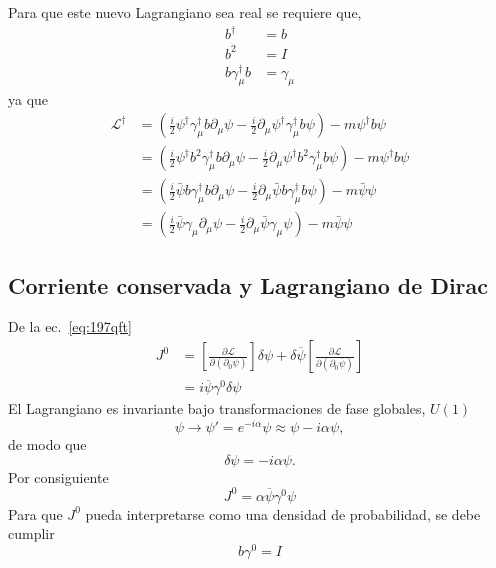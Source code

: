 Para que este nuevo Lagrangiano sea real se requiere que,
\begin{align}
  \label{eq:185qft}
  b^\dagger&=b\nonumber\\
  b^2&=I\nonumber\\
  b \gamma_\mu^\dagger b&=\gamma_\mu
\end{align}
ya que
\begin{align*}
  \mathcal{L}^\dagger&=\left(\frac{i}{2}\psi^\dagger \gamma_\mu^\dagger b \partial_\mu\psi-\frac{i}{2}\partial_\mu\psi^\dagger \gamma_\mu^\dagger b\psi\right)-m\psi^\dagger  b \psi\\
  &=\left(\frac{i}{2}\psi^\dagger b^2 \gamma_\mu^\dagger b \partial_\mu\psi-\frac{i}{2}\partial_\mu\psi^\dagger b^2 \gamma_\mu^\dagger b\psi\right)-m\psi^\dagger b \psi\\
  &=\left(\frac{i}{2}\bar{\psi} b \gamma_\mu^\dagger b \partial_\mu\psi-\frac{i}{2}\partial_\mu\bar{\psi}b \gamma_\mu^\dagger b\psi\right)-m\bar{\psi} \psi\\
  &=\left(\frac{i}{2}\bar{\psi} \gamma_\mu \partial_\mu\psi-\frac{i}{2}\partial_\mu\bar{\psi}\gamma_\mu \psi\right)-m\bar{\psi} \psi
\end{align*}

\subsection{Corriente conservada y Lagrangiano de Dirac}
\label{sec:corriente-conservada}
De la ec.~\eqref{eq:197qft}
\begin{align}
  J^0&=\left[\frac{\partial\mathcal{L}}{\partial\left(\partial_0\psi\right)}\right]\delta\psi+\delta\overline{\psi}\left[\frac{\partial\mathcal{L}}{\partial\left(\partial_0\overline{\psi}\right)}\right]\nonumber\\
  &=i\overline{\psi} \gamma^0 \delta\psi
\end{align}
El Lagrangiano es invariante bajo transformaciones de fase globales, $U(1)$
\begin{equation}
  \psi\to\psi'=e^{-i\alpha}\psi\approx\psi-i\alpha\psi,
\end{equation}
de modo que
\begin{equation}
  \delta\psi=-i\alpha\psi.
\end{equation}
Por consiguiente
\begin{equation}
  J^0=\alpha\overline{\psi} \gamma^0 \psi 
\end{equation}
Para que $J^0$ pueda interpretarse como una densidad de probabilidad, se debe cumplir
\begin{equation}
  \label{eq:bgamma0}
  b \gamma^0=I
\end{equation}


